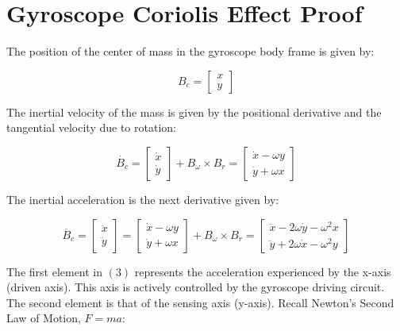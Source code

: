 \chapter{Gyroscope Coriolis Effect Proof} 

The position of the center of mass in the gyroscope body  frame is given by:

\begin{equation}
    B_c = 
    \begin{bmatrix}
        x \\
        y 
    \end{bmatrix}
\end{equation}

The inertial velocity of the mass is given by the positional derivative and the tangential velocity due to rotation:

\begin{equation}
    \dot{B_c} = 
    \begin{bmatrix}
        \dot{x} \\ 
        \dot{y}
    \end{bmatrix}
    + B_\omega \times B_r =
    \begin{bmatrix}
        \dot{x} - \omega y \\
        \dot{y} + \omega x
    \end{bmatrix}
\end{equation}

The inertial acceleration is the next derivative given by:

\begin{equation}
    \ddot{B_c} = 
    \begin{bmatrix}
        \ddot{x} \\
        \ddot{y}
    \end{bmatrix} = 
    \begin{bmatrix}
        \dot{x}-\omega y \\
        \dot{y} + \omega x
    \end{bmatrix}
    + B_\omega \times B_{\dot{r}} = 
    \begin{bmatrix}
        \ddot{x} - 2\omega\dot{y} - \omega^2 x \\
        \ddot{y} + 2\omega\dot{x} - \omega^2 y
    \end{bmatrix}
\end{equation}

The first element in $(3)$ represents the acceleration experienced by the x-axis (driven axis). This axis is actively controlled by the gyroscope driving circuit. The second element is that of the sensing axis (y-axis). Recall Newton’s Second Law of Motion, $F=ma$:

